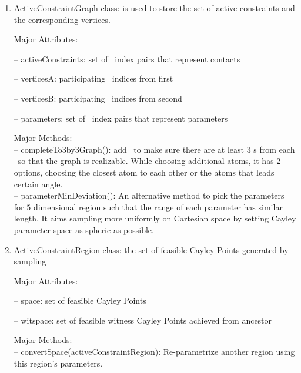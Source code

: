 \begin{enumerate}
\item \textsf{ActiveConstraintGraph} class: is used to store the set of active constraints and the corresponding vertices.

\smallskip
Major Attributes:

\noindent --  \textsf{activeConstraints}: set of \atom\ index pairs that represent contacts

\noindent --  \textsf{verticesA}: participating \atom\ indices from first \helix

\noindent --  \textsf{verticesB}: participating \atom\ indices from second \helix

\noindent --  \textsf{parameters}: set of \atom\ index pairs that represent parameters

\smallskip
Major Methods:\\
\smallskip
\noindent --  \textsf{completeTo3by3Graph()}: add \atom\ to make sure there are at least 3 \atom s from each \helix\ so that the graph is realizable.
While choosing additional atoms, it has 2 options, choosing the closest atom to each other or the atoms that leads certain angle. \\
\smallskip
\noindent --  \textsf{parameterMinDeviation()}: An alternative method to pick the parameters for $5$ dimensional region such that the range of each parameter has similar length.
It aims sampling more uniformly on Cartesian space by setting Cayley parameter space as spheric as possible.


\item \textsf{ActiveConstraintRegion} class: the set of feasible Cayley Points generated by sampling

\smallskip
Major Attributes:

\noindent --  \textsf{space}: set of feasible Cayley Points

\noindent --  \textsf{witspace}: set of feasible witness Cayley Points achieved from ancestor

\smallskip
Major Methods:\\
\smallskip
\noindent --  \textsf{convertSpace(activeConstraintRegion)}: Re-parametrize another region using this region’s parameters.


\end{enumerate}
